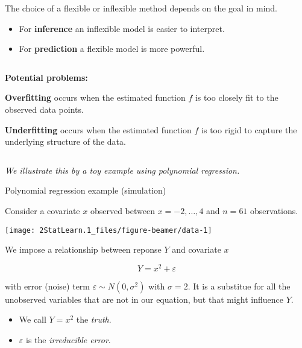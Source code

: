 \documentclass[ignorenonframetext,]{beamer}
\providecommand{\tightlist}{%
  \setlength{\itemsep}{0pt}\setlength{\parskip}{0pt}}
\begin{document}
\begin{frame}

The choice of a flexible or inflexible method depends on the goal in
mind.

\begin{itemize}
\tightlist
\item
  For \textbf{inference} an inflexible model is easier to interpret.
\item
  For \textbf{prediction} a flexible model is more powerful.
\end{itemize}

\(~\)

\textbf{Potential problems:}

\textbf{Overfitting} occurs when the estimated function \(f\) is too
closely fit to the observed data points.

\textbf{Underfitting} occurs when the estimated function \(f\) is too
rigid to capture the underlying structure of the data.

\(~\)

\emph{We illustrate this by a toy example using polynomial regression.}

\end{frame}

\begin{frame}

\begin{block}{Polynomial regression example (simulation)}

Consider a covariate \(x\) observed between \(x=-2, \ldots , 4\) and
\(n=61\) observations.

\begin{center}\texttt{[image: 2StatLearn.1\_files/figure-beamer/data-1]} \end{center}

\end{block}

\end{frame}

\begin{frame}

We impose a relationship between reponse \(Y\) and covariate \(x\)

\[ Y=x^2 + \varepsilon\]

with error (noise) term \(\varepsilon\sim N(0,\sigma^2)\) with
\(\sigma=2\). It is a substitue for all the unobserved variables that
are not in our equation, but that might influence \(Y\).

\begin{itemize}
\tightlist
\item
  We call \(Y=x^2\) the \emph{truth}.
\item
  \(\varepsilon\) is the \emph{irreducible error}.
\end{itemize}

\end{frame}
\end{document}
